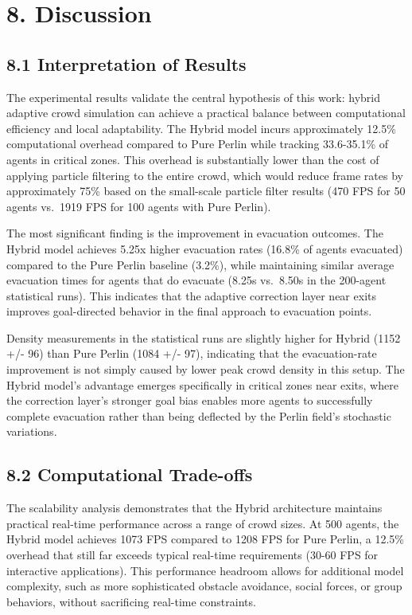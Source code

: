 \documentclass[
  11pt,
]{article}
\begin{document}
\section{8. Discussion}\label{discussion}

\subsection{8.1 Interpretation of
Results}\label{interpretation-of-results}

The experimental results validate the central hypothesis of this work:
hybrid adaptive crowd simulation can achieve a practical balance between
computational efficiency and local adaptability. The Hybrid model incurs
approximately 12.5\% computational overhead compared to Pure Perlin
while tracking 33.6-35.1\% of agents in critical zones. This overhead is
substantially lower than the cost of applying particle filtering to the
entire crowd, which would reduce frame rates by approximately 75\% based
on the small-scale particle filter results (470 FPS for 50 agents
vs.~1919 FPS for 100 agents with Pure Perlin).

The most significant finding is the improvement in evacuation outcomes.
The Hybrid model achieves 5.25x higher evacuation rates (16.8\% of
agents evacuated) compared to the Pure Perlin baseline (3.2\%), while
maintaining similar average evacuation times for agents that do evacuate
(8.25s vs.~8.50s in the 200-agent statistical runs). This indicates that
the adaptive correction layer near exits improves goal-directed behavior
in the final approach to evacuation points.

Density measurements in the statistical runs are slightly higher for
Hybrid (1152 +/- 96) than Pure Perlin (1084 +/- 97), indicating that the
evacuation-rate improvement is not simply caused by lower peak crowd
density in this setup. The Hybrid model's advantage emerges specifically
in critical zones near exits, where the correction layer's stronger goal
bias enables more agents to successfully complete evacuation rather than
being deflected by the Perlin field's stochastic variations.

\subsection{8.2 Computational
Trade-offs}\label{computational-trade-offs}

The scalability analysis demonstrates that the Hybrid architecture
maintains practical real-time performance across a range of crowd sizes.
At 500 agents, the Hybrid model achieves 1073 FPS compared to 1208 FPS
for Pure Perlin, a 12.5\% overhead that still far exceeds typical
real-time requirements (30-60 FPS for interactive applications). This
performance headroom allows for additional model complexity, such as
more sophisticated obstacle avoidance, social forces, or group
behaviors, without sacrificing real-time constraints.
\end{document}
